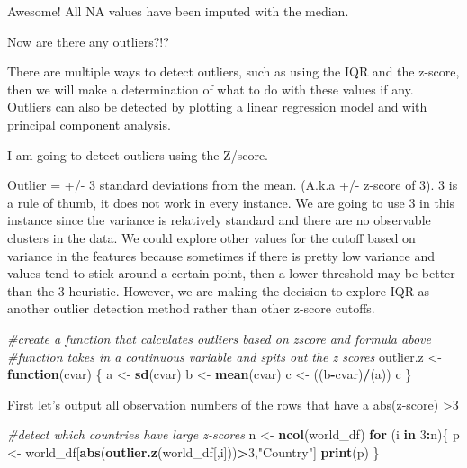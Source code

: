 \documentclass[]{article}
\newenvironment{Shaded}{\begin{snugshade}}{\end{snugshade}}
\newcommand{\CommentTok}[1]{\textcolor[rgb]{0.56,0.35,0.01}{\textit{#1}}}
\newcommand{\ControlFlowTok}[1]{\textcolor[rgb]{0.13,0.29,0.53}{\textbf{#1}}}
\newcommand{\DecValTok}[1]{\textcolor[rgb]{0.00,0.00,0.81}{#1}}
\newcommand{\KeywordTok}[1]{\textcolor[rgb]{0.13,0.29,0.53}{\textbf{#1}}}
\newcommand{\NormalTok}[1]{#1}
\newcommand{\OperatorTok}[1]{\textcolor[rgb]{0.81,0.36,0.00}{\textbf{#1}}}
\newcommand{\StringTok}[1]{\textcolor[rgb]{0.31,0.60,0.02}{#1}}
\begin{document}
Awesome! All NA values have been imputed with the median.

Now are there any outliers?!?

There are multiple ways to detect outliers, such as using the IQR and
the z-score, then we will make a determination of what to do with these
values if any. Outliers can also be detected by plotting a linear
regression model and with principal component analysis.

I am going to detect outliers using the Z/score.

Outlier = +/- 3 standard deviations from the mean. (A.k.a +/- z-score of
3). 3 is a rule of thumb, it does not work in every instance. We are
going to use 3 in this instance since the variance is relatively
standard and there are no observable clusters in the data. We could
explore other values for the cutoff based on variance in the features
because sometimes if there is pretty low variance and values tend to
stick around a certain point, then a lower threshold may be better than
the 3 heuristic. However, we are making the decision to explore IQR as
another outlier detection method rather than other z-score cutoffs.

\begin{Shaded}
\begin{Highlighting}[]
\CommentTok{#create a function that calculates outliers based on zscore and formula above}
\CommentTok{#function takes in a continuous variable and spits out the z scores}
\NormalTok{outlier.z <-}\StringTok{ }\ControlFlowTok{function}\NormalTok{(cvar) \{}
\NormalTok{a <-}\StringTok{ }\KeywordTok{sd}\NormalTok{(cvar)}
\NormalTok{b <-}\StringTok{ }\KeywordTok{mean}\NormalTok{(cvar)  }
\NormalTok{c <-}\StringTok{ }\NormalTok{((b}\OperatorTok{-}\NormalTok{cvar)}\OperatorTok{/}\NormalTok{(a))}
\NormalTok{c}
\NormalTok{\}}
\end{Highlighting}
\end{Shaded}

First let's output all observation numbers of the rows that have a
abs(z-score) \textgreater{}3

\begin{Shaded}
\begin{Highlighting}[]
\CommentTok{#detect which countries have large z-scores}
\NormalTok{n <-}\StringTok{ }\KeywordTok{ncol}\NormalTok{(world_df)}
\ControlFlowTok{for}\NormalTok{ (i }\ControlFlowTok{in} \DecValTok{3}\OperatorTok{:}\NormalTok{n)\{}
\NormalTok{p <-}\StringTok{ }\NormalTok{world_df[}\KeywordTok{abs}\NormalTok{(}\KeywordTok{outlier.z}\NormalTok{(world_df[,i]))}\OperatorTok{>}\DecValTok{3}\NormalTok{,}\StringTok{"Country"}\NormalTok{]}
\KeywordTok{print}\NormalTok{(p)}
\NormalTok{\}}
\end{Highlighting}
\end{Shaded}
\end{document}
